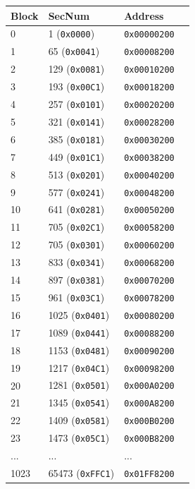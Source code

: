 \documentclass[a4paper,11pt]{article}
\begin{document}
    \begin{tabular}{ |m{1.3cm}m{3.3cm}m{2.2cm}|>{\raggedleft\arraybackslash}m{2cm}| }
        \hline
        \rowcolor{lightgray}
        Block & SecNum & Address \\
        \hline
        \hline
        0    & 1     (\texttt{0x0000}) & \texttt{0x00000200} \\
        1    & 65    (\texttt{0x0041}) & \texttt{0x00008200} \\
        2    & 129   (\texttt{0x0081}) & \texttt{0x00010200} \\
        3    & 193   (\texttt{0x00C1}) & \texttt{0x00018200} \\
        4    & 257   (\texttt{0x0101}) & \texttt{0x00020200} \\
        5    & 321   (\texttt{0x0141}) & \texttt{0x00028200} \\
        6    & 385   (\texttt{0x0181}) & \texttt{0x00030200} \\
        7    & 449   (\texttt{0x01C1}) & \texttt{0x00038200} \\
        8    & 513   (\texttt{0x0201}) & \texttt{0x00040200} \\
        9    & 577   (\texttt{0x0241}) & \texttt{0x00048200} \\
        10   & 641   (\texttt{0x0281}) & \texttt{0x00050200} \\
        11   & 705   (\texttt{0x02C1}) & \texttt{0x00058200} \\
        12   & 705   (\texttt{0x0301}) & \texttt{0x00060200} \\
        13   & 833   (\texttt{0x0341}) & \texttt{0x00068200} \\
        14   & 897   (\texttt{0x0381}) & \texttt{0x00070200} \\
        15   & 961   (\texttt{0x03C1}) & \texttt{0x00078200} \\
        16   & 1025  (\texttt{0x0401}) & \texttt{0x00080200} \\
        17   & 1089  (\texttt{0x0441}) & \texttt{0x00088200} \\
        18   & 1153  (\texttt{0x0481}) & \texttt{0x00090200} \\
        19   & 1217  (\texttt{0x04C1}) & \texttt{0x00098200} \\
        20   & 1281  (\texttt{0x0501}) & \texttt{0x000A0200} \\
        21   & 1345  (\texttt{0x0541}) & \texttt{0x000A8200} \\
        22   & 1409  (\texttt{0x0581}) & \texttt{0x000B0200} \\
        23   & 1473  (\texttt{0x05C1}) & \texttt{0x000B8200} \\
        ...  & ...                     & ...                 \\
        1023 & 65473 (\texttt{0xFFC1}) & \texttt{0x01FF8200} \\
        \hline
    \end{tabular}
\end{document}

